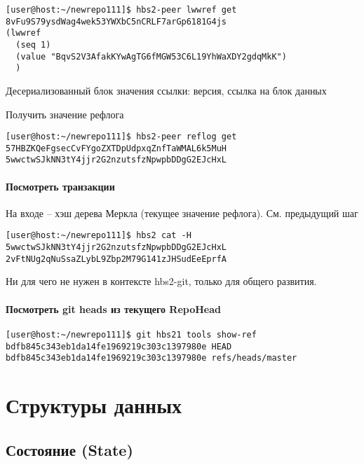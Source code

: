 \documentclass[11pt,a4paper]{article}
\begin{document}
\begin{verbatim}
[user@host:~/newrepo111]$ hbs2-peer lwwref get 8vFu9S79ysdWag4wek53YWXbC5nCRLF7arGp6181G4js
(lwwref
  (seq 1)
  (value "BqvS2V3AfakKYwAgTG6fMGW53C6L19YhWaXDY2gdqMkK")
  )
\end{verbatim}

Десериализованный блок значения ссылки: версия, ссылка на блок данных

Получить значение рефлога
\begin{verbatim}
[user@host:~/newrepo111]$ hbs2-peer reflog get 57HBZKQeFgsecCvFYgoZXTDpUdpxqZnfTaWMAL6k5MuH
5wwctwSJkNN3tY4jjr2G2nzutsfzNpwpbDDgG2EJcHxL
\end{verbatim}

\paragraph{Посмотреть транзакции}

На входе -- хэш дерева Меркла (текущее значение рефлога). См. предыдущий шаг

\begin{verbatim}
[user@host:~/newrepo111]$ hbs2 cat -H 5wwctwSJkNN3tY4jjr2G2nzutsfzNpwpbDDgG2EJcHxL
2vFtNUg2qNuSsaZLybL9Zbp2M79G141zJHSudEeEprfA
\end{verbatim}

Ни для чего не нужен в контексте hbs2-git, только для общего развития.

\paragraph{Посмотреть git heads из текущего RepoHead}

\begin{verbatim}
[user@host:~/newrepo111]$ git hbs21 tools show-ref
bdfb845c343eb1da14fe1969219c303c1397980e HEAD
bdfb845c343eb1da14fe1969219c303c1397980e refs/heads/master
\end{verbatim}

\section{Структуры данных}

\subsection{Состояние (State)}
\end{document}
